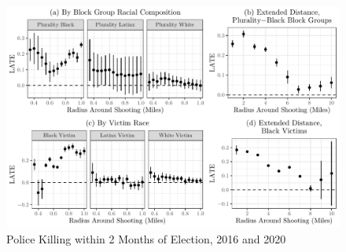 \documentclass[
  12pt,
]{article}
\begin{document}
\begin{figure}[h]

{\centering \includegraphics{shoot_to_files/figure-latex/paneled-race-effects-1} 

}

\caption{\label{fig:map}Police Killing within 2 Months of Election, 2016 and 2020}\label{fig:paneled-race-effects}
\end{figure}
\end{document}
